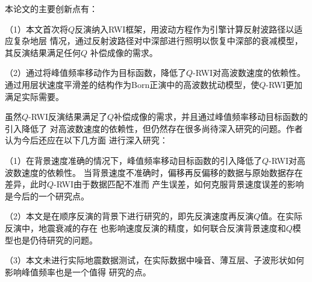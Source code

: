 
本论文的主要创新点有：

（1）本文首次将$Q$反演纳入RWI框架，用波动方程作为引擎计算反射波路径以适应复杂地层
情况，通过反射波路径对中深部进行照明以恢复中深部的衰减模型，其反演结果满足任何$Q$
补偿成像的需求。

（2）通过将峰值频率移动作为目标函数，降低了$Q$-RWI对高波数速度的依赖性。
通过用层状速度平滑差的结构作为Born正演中的高波数扰动模型，使$Q$-RWI更加满足实际需要。


虽然$Q$-RWI反演结果满足了$Q$补偿成像的需求，并且通过峰值频率移动目标函数的引入降低了
对高波数速度的依赖性，但仍然存在很多尚待深入研究的问题。作者认为今后还应在以下几方面
进行深入研究：

（1）在背景速度准确的情况下，峰值频率移动目标函数的引入降低了$Q$-RWI对高波数速度的依赖性。
当背景速度不准确时，偏移再反偏移的数据与原始数据存在差异，此时$Q$-RWI由于数据匹配不准而
产生误差，如何克服背景速度误差的影响是今后的一个研究点。

（2）本文是在顺序反演的背景下进行研究的，即先反演速度再反演$Q$值。在实际反演中，地震衰减的存在
也影响速度反演的精度，如何联合反演背景速度和$Q$模型也是仍待研究的问题。

（3）本文未进行实际地震数据测试，在实际数据中噪音、薄互层、子波形状如何影响峰值频率也是一个值得
研究的点。
